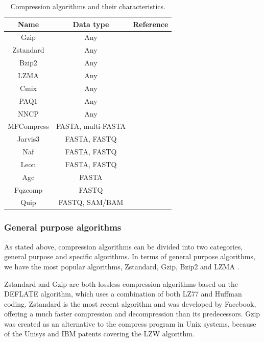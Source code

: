 \begin{table}
\caption{Compression algorithms and their characteristics.}
\label{table:compression_algorithms}
\begin{center}
    \begin{tabular}{|| c | c | c ||}
        \hline
        Name & Data type & Reference \\
        \hline
        Gzip        & Any & \citet{rfc1952}\\ \hline
        Zstandard   & Any & \citet{rfc8878}\\ \hline
        Bzip2       & Any & \citet{bzip2}\\ \hline
        LZMA        & Any & \citet{lzma}\\ \hline
        Cmix        & Any & \citet{cmix}\\ \hline
        PAQ1        & Any & \citet{Mahoney2002}\\ \hline
        NNCP        & Any & \citet{NNCP}\\ \hline
        MFCompress  & FASTA, multi-FASTA & \citet{Pinho2014}\\ \hline
        Jarvis3     & FASTA, FASTQ & \citet{jarvis3}\\ \hline
        Naf         & FASTA, FASTQ & \citet{Kryukov2019}\\ \hline
        Leon        & FASTA, FASTQ & \citet{Benoit2015}\\ \hline
        Agc         & FASTA & \citet{Deorowicz2023}\\ \hline
        Fqzcomp     & FASTQ & \citet{fqzcomp}\\ \hline
        Quip        & FASTQ, SAM/BAM & \citet{Jones2012}\\ \hline
    \end{tabular}
\end{center}
\end{table}

\subsubsection{General purpose algorithms}

As stated above, compression algorithms can be divided into two categories, general purpose and specific algorithms. In terms of general purpose algorithms, we have the most popular algorithms, Zstandard, Gzip, Bzip2 and LZMA \cite{GeekyHumans}.

Zstandard and Gzip are both lossless compression algorithms based on the DEFLATE algorithm, which uses a combination of both LZ77 and Huffman coding. Zstandard is the most recent algorithm and was developed by Facebook, offering a much faster compression and decompression than its predecessors. Gzip was created as an alternative to the compress program in Unix systems, because of the Unisys and IBM patents covering the LZW algorithm.

